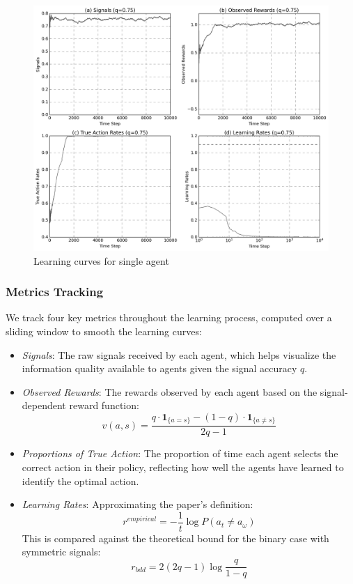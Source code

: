 \begin{figure}[htbp]
    \centering
    \includegraphics[width=1\textwidth]{../charts/single_agent_learning_curves_q=0.75.png}
    \caption{Learning curves for single agent}
    \label{fig:single-learning-curves}
\end{figure}

\subsubsection*{Metrics Tracking}
We track four key metrics throughout the learning process, computed over a sliding window to smooth the learning curves:

\begin{itemize}
    \item \textit{Signals}: The raw signals received by each agent, which helps visualize the information quality available to agents given the signal accuracy $q$.
    
    \item \textit{Observed Rewards}: The rewards observed by each agent based on the signal-dependent reward function:
    \[
        v(a,s) = \frac{q \cdot \mathbf{1}_{\{a = s\}} - (1-q) \cdot \mathbf{1}_{\{a \neq s\}}}{2q-1}
    \]
    
    \item \textit{Proportions of True Action}: The proportion of time each agent selects the correct action in their policy, reflecting how well the agents have learned to identify the optimal action.
    
    \item \textit{Learning Rates}: Approximating the paper's definition:
    \[
        r^{empirical} =  -\frac{1}{t} \log P(a_t \neq a_\omega)
    \]
    This is compared against the theoretical bound for the binary case with symmetric signals:
    \[
        r_{bdd} = 2(2q-1)\log\frac{q}{1-q}
    \]
\end{itemize}

